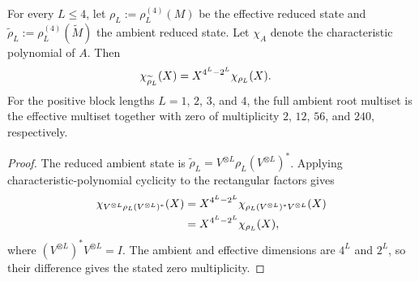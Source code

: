 \begin{lemma}
    \label{thm:cpsv_example411_length_four_ambient_spectra}
    \leanok
    For every $L\leq4$, let $\rho_L:=\rho_L^{(4)}(M)$ be the effective reduced
    state and $\widetilde\rho_L:=\rho_L^{(4)}(\widetilde M)$ the ambient reduced
    state.  Let $\chi_A$ denote the characteristic polynomial of $A$.  Then
    \begin{align}
        \chi_{\widetilde\rho_L}(X)
         & =X^{4^L-2^L}\chi_{\rho_L}(X).
        \notag
    \end{align}
    For the positive block lengths $L=1$, $2$, $3$, and $4$, the full ambient
    root multiset is the effective multiset together with zero of multiplicity
    $2$, $12$, $56$, and $240$, respectively.
\end{lemma}

\begin{proof}
    \leanok
    The reduced ambient state is
    $\widetilde\rho_L=V^{\otimes L}\rho_L(V^{\otimes L})^*$.  Applying
    characteristic-polynomial cyclicity to the rectangular factors gives
    \begin{align}
        \chi_{V^{\otimes L}\rho_L(V^{\otimes L})^*}(X)
         & =X^{4^L-2^L}
        \chi_{\rho_L(V^{\otimes L})^*V^{\otimes L}}(X) \\
         & =X^{4^L-2^L}\chi_{\rho_L}(X),
        \notag
    \end{align}
    where $(V^{\otimes L})^*V^{\otimes L}=I$.  The ambient and effective
    dimensions are $4^L$ and $2^L$, so their difference gives the stated zero
    multiplicity.
\end{proof}

